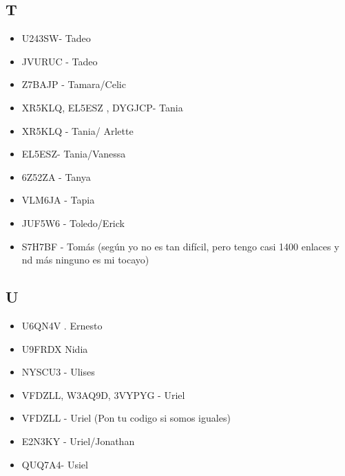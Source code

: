 \subsection*{T}
\begin{itemize}[leftmargin=*,nosep]
\item U243SW- Tadeo
\item JVURUC - Tadeo
\item Z7BAJP - Tamara/Celic
\item XR5KLQ, EL5ESZ , DYGJCP- Tania
\item XR5KLQ - Tania/ Arlette
\item EL5ESZ- Tania/Vanessa
\item 6Z52ZA - Tanya
\item VLM6JA - Tapia
\item JUF5W6 - Toledo/Erick
\item S7H7BF - Tomás (según yo no es tan difícil, pero tengo casi 1400 enlaces y nd más ninguno es mi tocayo)
\end{itemize}

\subsection*{U}
\begin{itemize}[leftmargin=*,nosep]
\item U6QN4V . Ernesto
\item U9FRDX Nidia
\item NYSCU3 - Ulises
\item VFDZLL, W3AQ9D, 3VYPYG - Uriel
\item VFDZLL - Uriel  (Pon tu codigo si somos iguales)
\item E2N3KY - Uriel/Jonathan
\item QUQ7A4- Usiel
\end{itemize}

